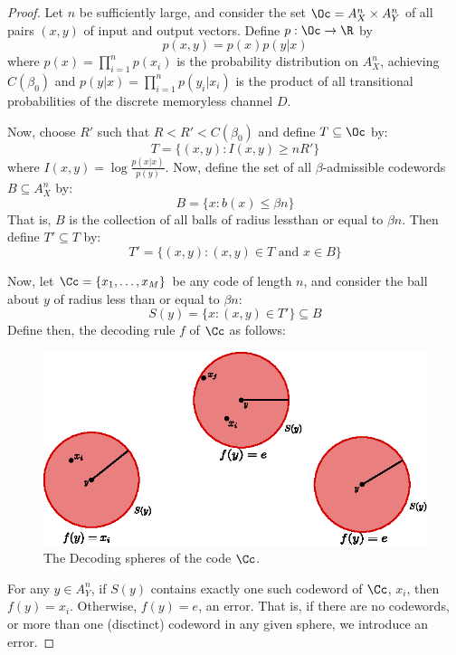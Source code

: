 \begin{proof}
    Let $n$ be sufficiently large, and consider the set  $\Oc=A_X^n \times
    A_Y^n$ of all pairs $(x,y)$ of input and output vectors. Define $p:\Oc
    \rightarrow \R$ by
    \begin{equation*}
        p(x,y)=p(x)p(y|x)
    \end{equation*}
    where $p(x)=\prod_{i=1}^n{p(x_i)}$ is the probability distribution on
    $A_X^n$, achieving $C (\beta_0)$ and $p (y|x)=\prod_{i=1}^n{p(y_i|x_i)}$ is
    the product of all transitional probabilities of the discrete memoryless
    channel $D$.

    Now, choose $R'$ such that  $R<R'<C(\beta_0)$ and define $T \subseteq \Oc$
    by:
    \begin{equation*}
        T=\{(x,y) : I(x,y) \geq nR'\}
    \end{equation*}
    where $I(x,y)=\log{\frac{p(x|x)}{p(y)}}$. Now, define the set of all
    $\beta$-admissible codewords  $B \subseteq A_X^n$ by:
    \begin{equation*}
        B=\{x : b(x) \leq \beta n\}
    \end{equation*}
    That is, $B$ is the collection of all balls of radius lessthan or equal to
    $\beta n$. Then define $T' \subseteq T$ by:
    \begin{equation*}
        T'=\{(x,y) : (x,y) \in T \text{ and } x \in B\}
    \end{equation*}

    Now, let $\Cc=\{x_1, \dots, x_M\}$ be any code of length $n$, and consider
    the ball about $y$ of radius less than or equal to $\beta n$:
    \begin{equation*}
        S(y)=\{x : (x,y) \in T'\} \subseteq B
    \end{equation*}
    Define then, the decoding rule $f$ of  $\Cc$ as follows:
     \begin{figure}[h]
        \centering
        \includegraphics[scale=1]{Figures/Chapter3/decoding_spheres.eps}
        \caption{The Decoding spheres of the code $\Cc$.}
        \label{fig_3.2}
    \end{figure}
    For any $y \in A_Y^n$, if  $S(y)$ contains exactly one such codeword of
    $\Cc$,  $x_i$, then  $f(y)=x_i$. Otherwise, $f(y)=e$, an error. That is, if
    there are no codewords, or more than one (disctinct) codeword in any given
    sphere, we introduce an error.


\end{proof}
